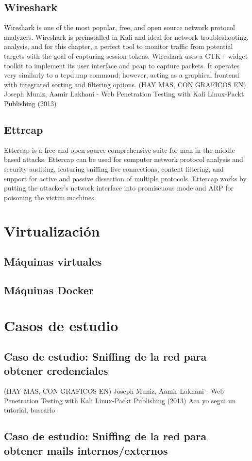 \subsection{Wireshark}
Wireshark is one of the most popular, free, and open source network protocol
analyzers. Wireshark is preinstalled in Kali and ideal for network troubleshooting,
analysis, and for this chapter, a perfect tool to monitor traffic from potential targets
with the goal of capturing session tokens. Wireshark uses a GTK+ widget toolkit to
implement its user interface and pcap to capture packets. It operates very similarly to
a tcpdump command; however, acting as a graphical frontend with integrated sorting
and filtering options.
(HAY MAS, CON GRAFICOS EN)
Joseph Muniz, Aamir Lakhani - Web Penetration Testing with Kali Linux-Packt Publishing (2013)

    \subsection{Ettrcap}
    Ettercap is a free and open source comprehensive suite for man-in-the-middle-based
attacks.
Ettercap can be used for computer network protocol analysis and security auditing,
featuring sniffing live connections, content filtering, and support for active and passive
dissection of multiple protocols. Ettercap works by putting the attacker's network
interface into promiscuous mode and ARP for poisoning the victim machines.
\section{Virtualización}
\subsection{Máquinas virtuales}
\subsection{Máquinas Docker}
   \section{Casos de estudio}
\subsection{Caso de estudio: Sniffing de la red para obtener credenciales}
(HAY MAS, CON GRAFICOS EN)
Joseph Muniz, Aamir Lakhani - Web Penetration Testing with Kali Linux-Packt Publishing (2013)
Aca yo segui un tutorial, buscarlo
\subsection{Caso de estudio: Sniffing de la red para obtener mails internos/externos}

